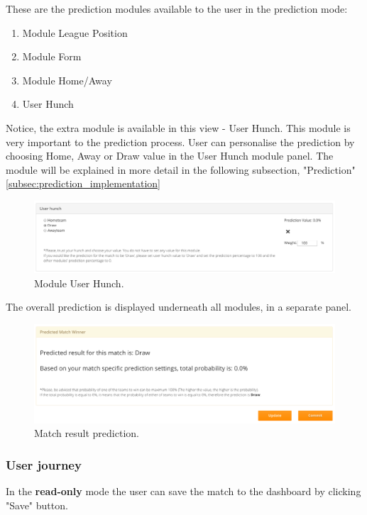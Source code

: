 These are the prediction modules available to the user in the prediction mode:

\begin{enumerate}
	\item Module League Position
	\item Module Form
	\item Module Home/Away
	\item User Hunch
\end{enumerate}

Notice, the extra module is available in this view - User Hunch. This module is very important to the prediction process. User can personalise the prediction by choosing Home, Away or Draw value in the User Hunch module panel. The module will be explained in more detail in the following subsection, "Prediction" \ref{subsec:prediction_implementation}

\begin{figure}[H]
	\begin{center}
		\includegraphics[width=.90\textwidth]{impl/images/userHunch}
		\caption{Module User Hunch.} \label{fig:using:userHunch}
	\end{center}
\end{figure}

The overall prediction is displayed underneath all modules, in a separate panel.

\begin{figure}[H]
	\begin{center}
		\includegraphics[width=.90\textwidth]{impl/images/prediction}
		\caption{Match result prediction.} \label{fig:using:prediction}
	\end{center}
\end{figure}

\subsubsection*{User journey}
\label{subsec:upcomingmatchviewuserjourney}
In the \textbf{read-only} mode the user can save the match to the dashboard by clicking "Save" button. 

